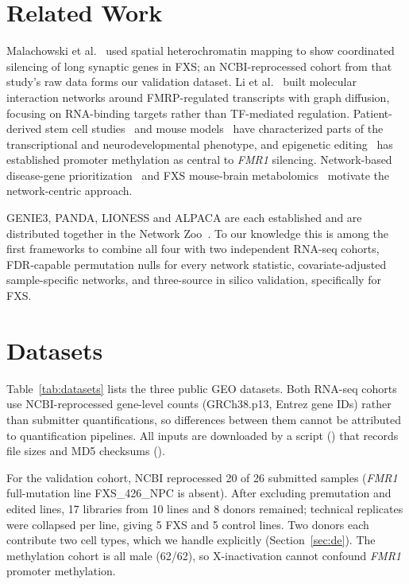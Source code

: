 \documentclass[journal]{IEEEtran}
\newcommand{\gene}[1]{\textit{#1}}
\begin{document}
\section{Related Work}
Malachowski et al.~\cite{malachowski2023} used spatial heterochromatin mapping to show coordinated silencing of long synaptic genes in FXS; an NCBI-reprocessed cohort from that study's raw data forms our validation dataset. Li et al.~\cite{li2020} built molecular interaction networks around FMRP-regulated transcripts with graph diffusion, focusing on RNA-binding targets rather than TF-mediated regulation. Patient-derived stem cell studies~\cite{boland2017,lu2016} and mouse models~\cite{rogers2017,arsenault2021} have characterized parts of the transcriptional and neurodevelopmental phenotype, and epigenetic editing~\cite{liu2018,brykczynska2016} has established promoter methylation as central to \gene{FMR1} silencing. Network-based disease-gene prioritization~\cite{nitsch2009} and FXS mouse-brain metabolomics~\cite{davidovic2011} motivate the network-centric approach.

GENIE3, PANDA, LIONESS and ALPACA are each established and are distributed together in the Network Zoo~\cite{netzoo}. To our knowledge this is among the first frameworks to combine all four with two independent RNA-seq cohorts, FDR-capable permutation nulls for every network statistic, covariate-adjusted sample-specific networks, and three-source in silico validation, specifically for FXS.

\section{Datasets}
Table~\ref{tab:datasets} lists the three public GEO datasets. Both RNA-seq cohorts use NCBI-reprocessed gene-level counts (GRCh38.p13, Entrez gene IDs) rather than submitter quantifications, so differences between them cannot be attributed to quantification pipelines. All inputs are downloaded by a script () that records file sizes and MD5 checksums ().

For the validation cohort, NCBI reprocessed 20 of 26 submitted samples (\gene{FMR1} full-mutation line FXS\_426\_NPC is absent). After excluding premutation and edited lines, 17 libraries from 10 lines and 8 donors remained; technical replicates were collapsed per line, giving 5 FXS and 5 control lines. Two donors each contribute two cell types, which we handle explicitly (Section~\ref{sec:de}). The methylation cohort is all male (62/62), so X-inactivation cannot confound \gene{FMR1} promoter methylation.
\end{document}
